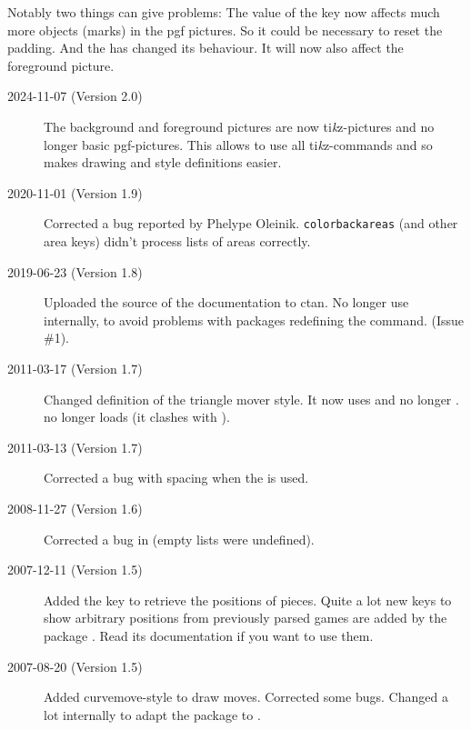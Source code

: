 \documentclass[pagesize,parskip=half-,fontsize=12pt]{scrartcl}
\begin{document}
Notably two things can give problems: The value of the
 key now affects much more objects (marks) in the pgf
pictures. So it could be necessary to reset the padding. And the
 has changed its behaviour. It will now also affect
the foreground picture.

\begin{description}
\item[2024-11-07 (Version 2.0)] The background and foreground pictures are now
ti\textit{k}z-pictures and no longer basic pgf-pictures. This allows to use all ti\textit{k}z-commands and so makes drawing and style definitions easier. 
  
\item[2020-11-01 (Version 1.9)] Corrected a bug reported by 
  Phelype Oleinik. \texttt{colorbackareas} (and other area keys) didn't process lists of areas correctly.

\item[2019-06-23 (Version 1.8)] Uploaded the source of the documentation to ctan.
  No longer use  internally, to avoid problems with packages redefining the command. (Issue \#1).

\item[2011-03-17 (Version 1.7)] Changed definition of the triangle mover
    style. It now uses  and no longer
    .  no longer loads
     (it clashes with ).

\item[2011-03-13 (Version 1.7)] Corrected a bug with spacing when the
     is used.


\item[2008-11-27 (Version 1.6)] Corrected a bug in 
(empty lists were undefined).


\item[2007-12-11 (Version 1.5)] Added the key  to
retrieve the positions of pieces. Quite a lot new keys to show
arbitrary positions from previously parsed games are added by the
package . Read its documentation if you want to
use them.

\item[2007-08-20 (Version 1.5)] Added curvemove-style to draw moves.
Corrected some bugs. Changed a lot internally to adapt the package to
.


\end{description}
\end{document}
